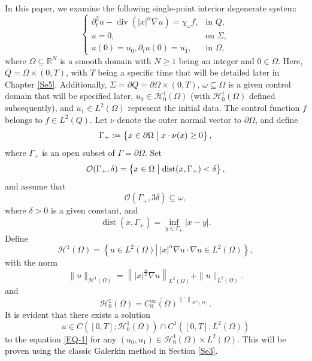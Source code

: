 \documentclass[11pt]{article}
\numberwithin{equation}{section}
\def\pt{\partial}
\def\s{\subseteq}
\def\pt{\partial}
\def\om{\omega}
\def\Om{\Omega}
\def\al{\alpha}
\def\de{\delta}
\def\Ga{\Gamma}
\def\ts{\times}
\def\mcH{\mathcal{H}}
\def\mcO{\mathcal{O}}
\DeclareMathOperator{\Div}{div}
\DeclareMathOperator{\dist}{dist}
\newcommand{\R}{\mathbb R}
\begin{document}
		In this paper, we examine the following single-point interior degenerate system:
		\begin{equation}\label{EQ-1}
			\begin{cases}
				\pt_t^2 u-\Div\left(|x|^\alpha \nabla u\right)=\chi_\omega f, & \mbox{in } Q, \\
				u=0, & \mbox{on } \Sigma,\\
				u(0)=u_0, \pt_tu(0)=u_1, &\mbox{in }\Om,
			\end{cases}
		\end{equation}
		where  $\Om\s\R^N$  is a smooth domain with $N\geq 1$ being an integer and $0\in \Om$. Here, $Q=\Om\ts (0,T)$, with $T$ being a specific time that will be detailed later in Chapter \ref{Se5}. Additionally, $\Sigma=\pt Q=\pt\Om\ts (0,T)$, $\om\s\Om$ is a given control domain that will be specified later, $u_0\in \mcH_0^1(\Om)$ (with  $\mcH_0^1(\Om)$ defined subsequently), and
		$u_1\in L^2(\Om)$  represent the initial data. The control function $f$ belongs to $f\in L^2(Q)$. Let $\nu$ denote the outer normal vector to  $\pt\Om$, and define
		\begin{equation*}
			\Ga_+:=\left\{x\in\pt\Om\bigm| x\cdot \nu(x)\geq 0\right\},
		\end{equation*}
		where $\Ga_+$ is an open subset of $\Ga=\pt\Om$. Set
		\begin{equation*}
			\mcO(\Ga_+,\de)=\left\{x\in\Om\bigm| \dist(x,\Ga_+)<\de \right\},
		\end{equation*}
		and assume that
		\begin{equation}\label{2-6}
			\mcO(\Ga_+, 3\de)\s \om,
		\end{equation}
		where $\de>0$ is a given constant,  and
		\begin{equation*}
			\dist(x, \Ga_+)=\inf_{y\in \Ga_+}|x-y|.
		\end{equation*}
		Define
		\begin{equation*}
			\mcH^1(\Om)=\left\{u\in L^2(\Om)\left| \ \! |x|^\al \nabla u\cdot \nabla u\in L^2(\Om)\right.\right\},
		\end{equation*}
		with the norm
		\begin{equation*}
			\|u\|_{\mcH^1(\Om)}=\left\| |x|^{\frac{\alpha}{2}} \nabla u \right\|_{L^2(\Omega)}+\|u\|_{L^2(\Omega)}.
		\end{equation*}
		and
		\begin{equation*}
			\mcH_0^1(\Om)=\overline{C_0^\infty(\Omega)}^{\left\|\cdot \right\|_{\mcH^1(\Om)} }.
		\end{equation*}
		It is evident that there exists a solution
		\begin{equation*}
			u\in C([0,T]; \mcH_0^1(\Om))\cap C^1([0,T]; L^2(\Om))
		\end{equation*}
		to the  equation \eqref{EQ-1} for any  $(u_0,u_1)\in \mcH_0^1(\Om)\times  L^2(\Om)$.  This will be proven using the classic Galerkin method in Section \ref{Se3}.
		
\end{document}
